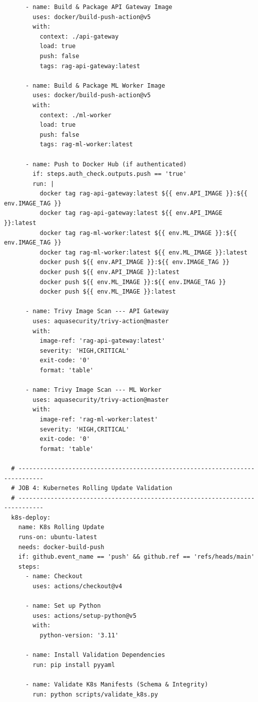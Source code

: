 \documentclass[12pt,a4paper]{report}
\begin{document}
\begin{lstlisting}
      - name: Build & Package API Gateway Image
        uses: docker/build-push-action@v5
        with:
          context: ./api-gateway
          load: true
          push: false
          tags: rag-api-gateway:latest

      - name: Build & Package ML Worker Image
        uses: docker/build-push-action@v5
        with:
          context: ./ml-worker
          load: true
          push: false
          tags: rag-ml-worker:latest

      - name: Push to Docker Hub (if authenticated)
        if: steps.auth_check.outputs.push == 'true'
        run: |
          docker tag rag-api-gateway:latest ${{ env.API_IMAGE }}:${{ env.IMAGE_TAG }}
          docker tag rag-api-gateway:latest ${{ env.API_IMAGE }}:latest
          docker tag rag-ml-worker:latest ${{ env.ML_IMAGE }}:${{ env.IMAGE_TAG }}
          docker tag rag-ml-worker:latest ${{ env.ML_IMAGE }}:latest
          docker push ${{ env.API_IMAGE }}:${{ env.IMAGE_TAG }}
          docker push ${{ env.API_IMAGE }}:latest
          docker push ${{ env.ML_IMAGE }}:${{ env.IMAGE_TAG }}
          docker push ${{ env.ML_IMAGE }}:latest

      - name: Trivy Image Scan --- API Gateway
        uses: aquasecurity/trivy-action@master
        with:
          image-ref: 'rag-api-gateway:latest'
          severity: 'HIGH,CRITICAL'
          exit-code: '0'
          format: 'table'

      - name: Trivy Image Scan --- ML Worker
        uses: aquasecurity/trivy-action@master
        with:
          image-ref: 'rag-ml-worker:latest'
          severity: 'HIGH,CRITICAL'
          exit-code: '0'
          format: 'table'

  # -----------------------------------------------------------------------------
  # JOB 4: Kubernetes Rolling Update Validation
  # -----------------------------------------------------------------------------
  k8s-deploy:
    name: K8s Rolling Update
    runs-on: ubuntu-latest
    needs: docker-build-push
    if: github.event_name == 'push' && github.ref == 'refs/heads/main'
    steps:
      - name: Checkout
        uses: actions/checkout@v4

      - name: Set up Python
        uses: actions/setup-python@v5
        with:
          python-version: '3.11'

      - name: Install Validation Dependencies
        run: pip install pyyaml

      - name: Validate K8s Manifests (Schema & Integrity)
        run: python scripts/validate_k8s.py


\end{lstlisting}
\end{document}
